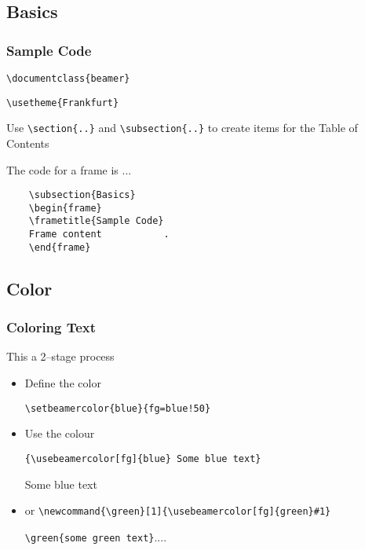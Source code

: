 \subsection{Basics}
\begin{frame}[fragile]
\frametitle{Sample Code}
\verb+\documentclass{beamer}+
	
\verb+\usetheme{Frankfurt}+
	
Use \verb+\section{..}+  and \verb+\subsection{..}+ to
create items for the Table of Contents
	
\alert<1>{The code for a frame is ...}
\begin{verbatim}
	\subsection{Basics}
	\begin{frame}
	\frametitle{Sample Code}
	Frame content	        .
	\end{frame}\end{verbatim}
\end{frame}


\subsection{Color}

\begin{frame}[fragile]
	\frametitle{Coloring Text}
	This a 2--stage process
	\begin{itemize}
		\item {\red Define} {\green the} {\blue color}
		
		\verb+\setbeamercolor{blue}{fg=blue!50}+\pause
		\item Use the colour
		
		\verb+{\usebeamercolor[fg]{blue} Some blue text}+
		
		{ Some blue text}
		\pause
		\item or
		{\small\verb+\newcommand{\green}[1]{\usebeamercolor[fg]{green}#1}+}
		
		\verb++....\green{some green text}
		
	\end{itemize}
	
\end{frame}



